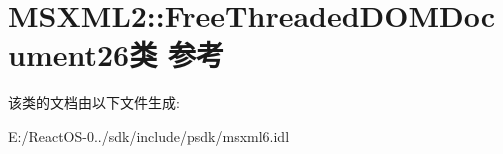 \hypertarget{class_m_s_x_m_l2_1_1_free_threaded_d_o_m_document26}{}\section{M\+S\+X\+M\+L2\+:\+:Free\+Threaded\+D\+O\+M\+Document26类 参考}
\label{class_m_s_x_m_l2_1_1_free_threaded_d_o_m_document26}


该类的文档由以下文件生成\+:\begin{DoxyCompactItemize}
\item 
E\+:/\+React\+O\+S-\/0../sdk/include/psdk/msxml6.\+idl\end{DoxyCompactItemize}
